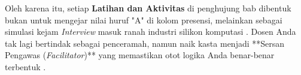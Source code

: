 Oleh karena itu, setiap \textbf{Latihan dan Aktivitas} di penghujung bab dibentuk bukan untuk mengejar nilai huruf "A" di kolom presensi, melainkan sebagai simulasi kejam \textit{Interview} masuk ranah industri silikon komputasi \cite{benari_matlogic}. Dosen Anda tak lagi bertindak sebagai penceramah, namun naik kasta menjadi **Sersan Pengawas (\textit{Facilitator})** yang memastikan otot logika Anda benar-benar terbentuk \cite{obe_springer2024}.
